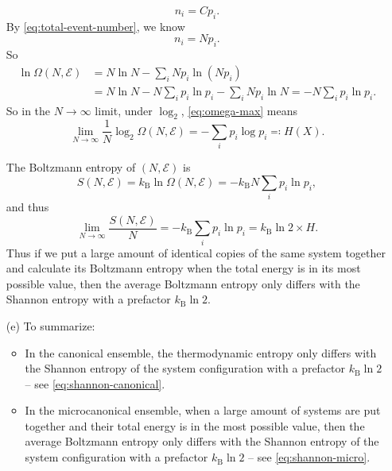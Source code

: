 \documentclass[hyperref, a4paper]{article}
\begin{document}
\begin{itemize}
\[    n_i = C p_i.
\]
By \eqref{eq:total-event-number}, we know 
\begin{equation}
    n_i = N p_i.
\end{equation}
So 
\begin{equation}
    \begin{aligned}
        \ln \Omega(N, \mathcal{E}) &= N \ln N - \sum_i N p_i \ln (N p_i) \\
        &= N \ln N - N \sum_i p_i \ln p_i - \sum_i N p_i \ln N = - N \sum_i p_i \ln p_i.
    \end{aligned}
    \label{eq:omega-max}
\end{equation}
So in the $N \to \infty$ limit, under $\log_2$, \eqref{eq:omega-max} means  
\begin{equation}
    \lim_{N \to \infty } \frac{1}{N} \log_2 \Omega(N, \mathcal{E}) = - \sum_i p_i \log p_i \eqqcolon H(X).
\end{equation}

The Boltzmann entropy of $(N, \mathcal{E})$ is 
\begin{equation}
    S(N, \mathcal{E}) = k_{\text{B}} \ln \Omega(N, \mathcal{E}) = - k_{\text{B}} N \sum_i p_i \ln p_i,
\end{equation}
and thus 
\begin{equation}
    \lim_{N \to \infty} \frac{S(N, \mathcal{E})}{N} = - k_{\text{B}} \sum_{i} p_i \ln p_i 
    = k_{\text{B}} \ln 2 \times H.
    \label{eq:shannon-micro}
\end{equation}
Thus if we put a large amount of identical copies of the same system together 
and calculate its Boltzmann entropy when the total energy is in its most possible value,
then the average Boltzmann entropy only differs with the Shannon entropy with a prefactor $k_{\text{B}} \ln 2$.

\item[(e)] To summarize:
\begin{itemize}
    \item In the canonical ensemble, the thermodynamic entropy 
    only differs with the Shannon entropy of the system configuration 
    with a prefactor $k_{\text{B}} \ln 2$ -- see \eqref{eq:shannon-canonical}.
    \item In the microcanonical ensemble, when a large amount of systems are put together 
    and their total energy is in the most possible value, 
    then the average Boltzmann entropy only differs with the Shannon entropy of the system configuration 
    with a prefactor $k_{\text{B}} \ln 2$ -- see \eqref{eq:shannon-micro}. 
\end{itemize}


\end{itemize}
\end{document}
